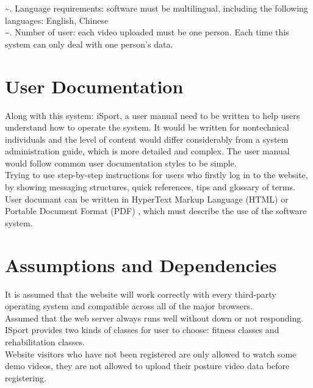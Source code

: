 \documentclass[16pt]{scrreprt}
\begin{document}
\~

. Language requirements: software must be multilingual, including the following languages: English, Chinese\\

\~

. Number of user: each video uploaded must be one person. Each time this system can only deal with one person's data.\\

\section{User Documentation}

Along with this system: iSport, a user manual need to be written to help users understand how to operate the system. It would be written for nontechnical individuals and the level of content would differ considerably from a system administration guide, which is more detailed and complex. The user manual would follow common user documentation styles to be simple.\\

Trying to use step-by-step instructions for users who firstly log in to the website, by showing messaging structures, quick references, tips and glossary of terms.\\

User documant can be written in HyperText Markup Language (HTML) or Portable Document Format (PDF) , which must describe the use of the software system.

\section{Assumptions and Dependencies}

It is assumed that the website will work correctly with every third-party operating
system and compatible across all of the major browsers.\\

Assumed that the web server always runs well without down or not responding.\\


ISport provides two kinds of classes for user to choose: fitness classes and rehabilitation classes.\\

Website visitors who have not been registered are only allowed to watch some demo videos, they are not allowed to upload their posture video data before registering.\\
\end{document}
